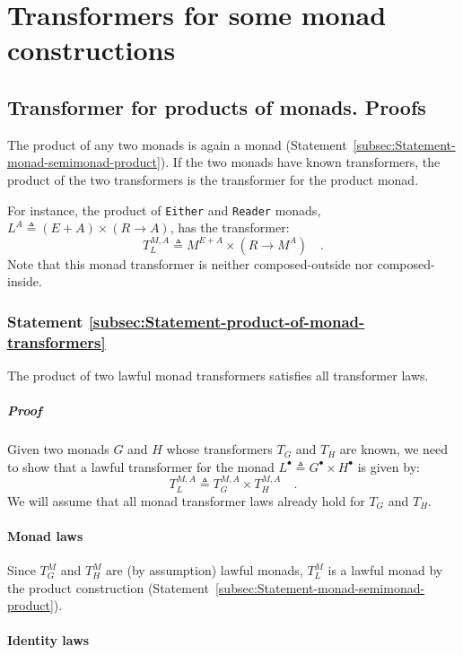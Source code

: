 \section{Transformers for some monad constructions}

\subsection{Transformer for products of monads. Proofs}

The product of any two monads is again a monad (Statement~\ref{subsec:Statement-monad-semimonad-product}).
If the two monads have known transformers, the product of the two
transformers is the transformer for the product monad. 

For instance, the product of \lstinline!Either! and \lstinline!Reader!
monads, $L^{A}\triangleq(E+A)\times(R\rightarrow A)$, has the transformer:
\[
T_{L}^{M,A}\triangleq M^{E+A}\times(R\rightarrow M^{A})\quad.
\]
Note that this monad transformer is neither composed-outside nor composed-inside.

\subsubsection{Statement \label{subsec:Statement-product-of-monad-transformers}\ref{subsec:Statement-product-of-monad-transformers}}

The product of two lawful monad transformers satisfies all transformer
laws.

\subparagraph{Proof}

Given two monads $G$ and $H$ whose transformers $T_{G}$ and $T_{H}$
are known, we need to show that a lawful transformer for the monad
$L^{\bullet}\triangleq G^{\bullet}\times H^{\bullet}$ is given by:
\[
T_{L}^{M,A}\triangleq T_{G}^{M,A}\times T_{H}^{M,A}\quad.
\]
We will assume that all monad transformer laws already hold for $T_{G}$
and $T_{H}$.

\paragraph{Monad laws}

Since $T_{G}^{M}$ and $T_{H}^{M}$ are (by assumption) lawful monads,
$T_{L}^{M}$ is a lawful monad by the product construction (Statement~\ref{subsec:Statement-monad-semimonad-product}).

\paragraph{Identity laws}

